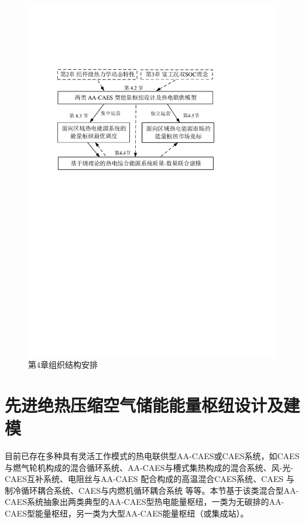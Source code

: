 \begin{figure}[H] %
  \centering
  \includegraphics[scale=0.85]{figures/Chap4-1-Hub-Flow-Chart-V3.pdf}
  \caption{第4章组织结构安排}
  \label{fig:Hub-Flow-Chart}
\end{figure}

\section{先进绝热压缩空气储能能量枢纽设计及建模}
\label{sec:struc-EH-CAES}
目前已存在多种具有灵活工作模式的热电联供型AA-CAES或CAES系统，如CAES与燃气轮机构成的混合循环系统\cite{CAES-Concepts-Review-10}、AA-CAES与槽式集热构成的混合系统\cite{ST-CAES-CXT-18,ST-CAES-17}、风-光-CAES互补系统\cite{Thermo-WSCAES-17}、电阻丝与AA-CAES 配合构成的高温混合CAES系统\cite{Hybrid-CAES-14, HTH-CAES-Berk-18}、CAES 与制冷循环耦合系统\cite{CAES-Refri-06}、CAES与内燃机循环耦合系统\cite{CAES-Inner-Comb-06} 等等。本节基于该类混合型AA-CAES系统抽象出两类典型的AA-CAES型热电能量枢纽，一类为无碳排的AA-CAES型能量枢纽，另一类为大型AA-CAES能量枢纽（或集成站）。%

